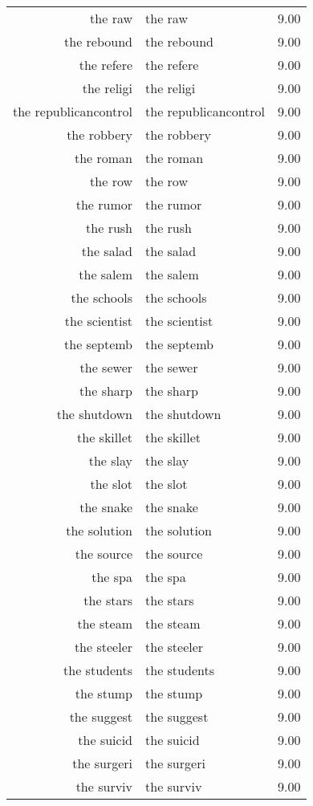 \begin{table}[ht]
\begin{tabular}{rlr}
  the raw & the raw & 9.00 \\ 
  the rebound & the rebound & 9.00 \\ 
  the refere & the refere & 9.00 \\ 
  the religi & the religi & 9.00 \\ 
  the republicancontrol & the republicancontrol & 9.00 \\ 
  the robbery & the robbery & 9.00 \\ 
  the roman & the roman & 9.00 \\ 
  the row & the row & 9.00 \\ 
  the rumor & the rumor & 9.00 \\ 
  the rush & the rush & 9.00 \\ 
  the salad & the salad & 9.00 \\ 
  the salem & the salem & 9.00 \\ 
  the schools & the schools & 9.00 \\ 
  the scientist & the scientist & 9.00 \\ 
  the septemb & the septemb & 9.00 \\ 
  the sewer & the sewer & 9.00 \\ 
  the sharp & the sharp & 9.00 \\ 
  the shutdown & the shutdown & 9.00 \\ 
  the skillet & the skillet & 9.00 \\ 
  the slay & the slay & 9.00 \\ 
  the slot & the slot & 9.00 \\ 
  the snake & the snake & 9.00 \\ 
  the solution & the solution & 9.00 \\ 
  the source & the source & 9.00 \\ 
  the spa & the spa & 9.00 \\ 
  the stars & the stars & 9.00 \\ 
  the steam & the steam & 9.00 \\ 
  the steeler & the steeler & 9.00 \\ 
  the students & the students & 9.00 \\ 
  the stump & the stump & 9.00 \\ 
  the suggest & the suggest & 9.00 \\ 
  the suicid & the suicid & 9.00 \\ 
  the surgeri & the surgeri & 9.00 \\ 
  the surviv & the surviv & 9.00 \\ 

\end{tabular}
\end{table}
